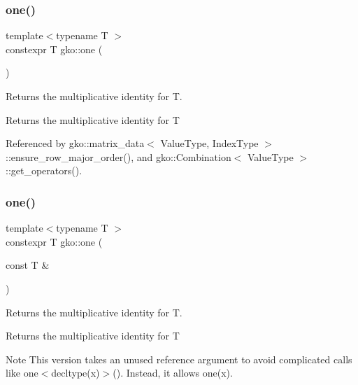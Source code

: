 \subsubsection{\texorpdfstring{one()}{one()}\hspace{0.1cm}{\footnotesize\ttfamily [1/2]}}
{\footnotesize\ttfamily template$<$typename T $>$ \\
constexpr T gko\+::one (\begin{DoxyParamCaption}{ }\end{DoxyParamCaption})\hspace{0.3cm}{\ttfamily [inline]}}



Returns the multiplicative identity for T. 

\begin{DoxyReturn}{Returns}
the multiplicative identity for T 
\end{DoxyReturn}


Referenced by gko\+::matrix\+\_\+data$<$ Value\+Type, Index\+Type $>$\+::ensure\+\_\+row\+\_\+major\+\_\+order(), and gko\+::\+Combination$<$ Value\+Type $>$\+::get\+\_\+operators().

\mbox{\label{namespacegko_ab4f16ecf0a759f46259cf9518f1e4568}} 
\subsubsection{\texorpdfstring{one()}{one()}\hspace{0.1cm}{\footnotesize\ttfamily [2/2]}}
{\footnotesize\ttfamily template$<$typename T $>$ \\
constexpr T gko\+::one (\begin{DoxyParamCaption}\item[{const T \&}]{ }\end{DoxyParamCaption})\hspace{0.3cm}{\ttfamily [inline]}}



Returns the multiplicative identity for T. 

\begin{DoxyReturn}{Returns}
the multiplicative identity for T
\end{DoxyReturn}
\begin{DoxyNote}{Note}
This version takes an unused reference argument to avoid complicated calls like {\ttfamily one$<$decltype(x)$>$()}. Instead, it allows {\ttfamily one(x)}. 
\end{DoxyNote}
\mbox{\label{namespacegko_accf1dbf5054c76e154490d825b0f44ee}} 
